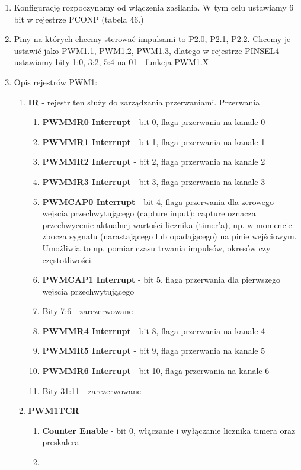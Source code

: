\begin{enumerate}
    \item Konfigurację rozpoczynamy od włączenia zasilania. W tym celu ustawiamy 6 bit w rejestrze PCONP (tabela 46.) %
    \item Piny na których chcemy sterować impulsami to P2.0, P2.1, P2.2. Chcemy je ustawić jako PWM1.1, PWM1.2, PWM1.3, dlatego w rejestrze PINSEL4 ustawiamy bity 1:0, 3:2, 5:4 na 01 - funkcja PWM1.X
    \item Opis rejestrów PWM1:\\
    \begin{enumerate}
        \item \textbf{IR} - rejestr ten służy do zarządzania przerwaniami. Przerwania 
        \begin{enumerate}
            \item \textbf{PWMMR0 Interrupt} - bit 0, flaga przerwania na kanale 0
            \item \textbf{PWMMR1 Interrupt} - bit 1, flaga przerwania na kanale 1
            \item \textbf{PWMMR2 Interrupt} - bit 2, flaga przerwania na kanale 2
            \item \textbf{PWMMR3 Interrupt} - bit 3, flaga przerwania na kanale 3
            \item \textbf{PWMCAP0 Interrupt} - bit 4, flaga przerwania dla zerowego wejscia przechwytującego (capture input); capture oznacza przechwycenie aktualnej wartości licznika (timer'a), np. w momencie zbocza sygnału (narastającego lub opadającego) na pinie wejściowym. Umożliwia to np. pomiar czasu trwania impulsów, okresów czy częstotliwości.
            \item \textbf{PWMCAP1 Interrupt} - bit 5, flaga przerwania dla pierwszego wejscia przechwytującego 
            \item Bity 7:6 - zarezerwowane
            \item \textbf{PWMMR4 Interrupt} - bit 8, flaga przerwania na kanale 4
            \item \textbf{PWMMR5 Interrupt} - bit 9, flaga przerwania na kanale 5
            \item \textbf{PWMMR6 Interrupt} - bit 10, flaga przerwania na kanale 6
            \item Bity 31:11 - zarezerwowane

        \end{enumerate}
        \item \textbf{PWM1TCR}
        \begin{enumerate}
            \item \textbf{ Counter Enable} - bit 0, włączanie i wyłączanie licznika timera oraz preskalera
            \item 
        \end{enumerate}
    \end{enumerate}
\end{enumerate}
